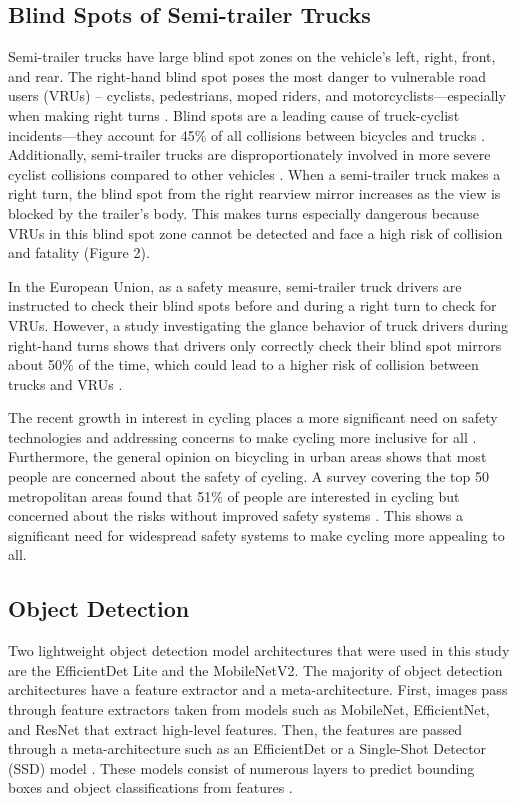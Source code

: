\documentclass{article}
\begin{document}
\subsection{Blind Spots of Semi-trailer Trucks}
Semi-trailer trucks have large blind spot zones on the vehicle's left, right, front, and rear. The right-hand blind spot poses the most danger to vulnerable road users (VRUs) – cyclists, pedestrians, moped riders, and motorcyclists—especially when making right turns \cite{wang_exploring_2022}. Blind spots are a leading cause of truck-cyclist incidents—they account for 45\% of all collisions between bicycles and trucks \cite{wang_exploring_2022}. Additionally, semi-trailer trucks are disproportionately involved in more severe cyclist collisions compared to other vehicles \cite{richter_turning_2017}. When a semi-trailer truck makes a right turn, the blind spot from the right rearview mirror increases as the view is blocked by the trailer's body. This makes turns especially dangerous because VRUs in this blind spot zone cannot be detected and face a high risk of collision and fatality \cite{wang_exploring_2022} (Figure 2).

In the European Union, as a safety measure, semi-trailer truck drivers are instructed to check their blind spots before and during a right turn to check for VRUs. However, a study investigating the glance behavior of truck drivers during right-hand turns shows that drivers only correctly check their blind spot mirrors about 50\% of the time, which could lead to a higher risk of collision between trucks and VRUs \cite{jansen_caught_2022}. 

The recent growth in interest in cycling places a more significant need on safety technologies and addressing concerns to make cycling more inclusive for all \cite{dill_revisiting_2016}. Furthermore, the general opinion on bicycling in urban areas shows that most people are concerned about the safety of cycling. A survey covering the top 50 metropolitan areas found that 51\% of people are interested in cycling but concerned about the risks without improved safety systems \cite{dill_revisiting_2016}. This shows a significant need for widespread safety systems to make cycling more appealing to all.

\subsection{Object Detection}
Two lightweight object detection model architectures that were used in this study are the EfficientDet Lite and the MobileNetV2. The majority of object detection architectures have a feature extractor and a meta-architecture. First, images pass through feature extractors taken from models such as MobileNet, EfficientNet, and ResNet that extract high-level features. Then, the features are passed through a meta-architecture such as an EfficientDet or a Single-Shot Detector (SSD) model \cite{sandler_mobilenetv2_2018} \cite{tan_efficientdet_2020}. These models consist of numerous layers to predict bounding boxes and object classifications from features \cite{liu_ssd_2016}. 
\end{document}
